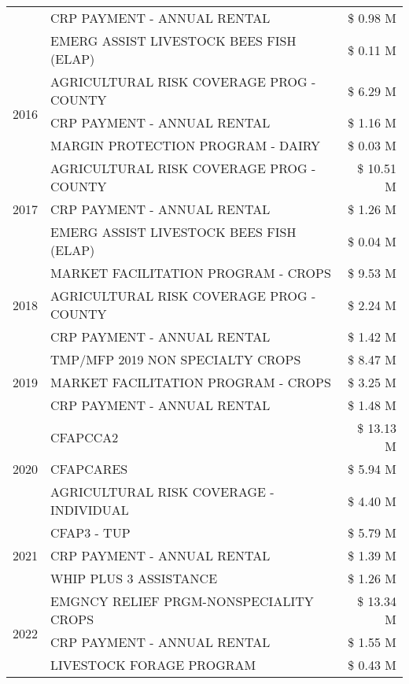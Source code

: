 \begin{tabular}{llr}
 & CRP PAYMENT - ANNUAL RENTAL & \$ 0.98 M \\
 & EMERG ASSIST LIVESTOCK BEES FISH (ELAP) & \$ 0.11 M \\
\cline{1-3}
\multirow[t]{3}{*}{2016} & AGRICULTURAL RISK COVERAGE PROG - COUNTY & \$ 6.29 M \\
 & CRP PAYMENT - ANNUAL RENTAL & \$ 1.16 M \\
 & MARGIN PROTECTION PROGRAM - DAIRY & \$ 0.03 M \\
\cline{1-3}
\multirow[t]{3}{*}{2017} & AGRICULTURAL RISK COVERAGE PROG - COUNTY & \$ 10.51 M \\
 & CRP PAYMENT - ANNUAL RENTAL & \$ 1.26 M \\
 & EMERG ASSIST LIVESTOCK BEES FISH (ELAP) & \$ 0.04 M \\
\cline{1-3}
\multirow[t]{3}{*}{2018} & MARKET FACILITATION PROGRAM - CROPS & \$ 9.53 M \\
 & AGRICULTURAL RISK COVERAGE PROG - COUNTY & \$ 2.24 M \\
 & CRP PAYMENT - ANNUAL RENTAL & \$ 1.42 M \\
\cline{1-3}
\multirow[t]{3}{*}{2019} & TMP/MFP 2019 NON SPECIALTY CROPS & \$ 8.47 M \\
 & MARKET FACILITATION PROGRAM - CROPS & \$ 3.25 M \\
 & CRP PAYMENT - ANNUAL RENTAL & \$ 1.48 M \\
\cline{1-3}
\multirow[t]{3}{*}{2020} & CFAPCCA2 & \$ 13.13 M \\
 & CFAPCARES & \$ 5.94 M \\
 & AGRICULTURAL RISK COVERAGE - INDIVIDUAL & \$ 4.40 M \\
\cline{1-3}
\multirow[t]{3}{*}{2021} & CFAP3 - TUP & \$ 5.79 M \\
 & CRP PAYMENT - ANNUAL RENTAL & \$ 1.39 M \\
 & WHIP PLUS 3 ASSISTANCE & \$ 1.26 M \\
\cline{1-3}
\multirow[t]{3}{*}{2022} & EMGNCY RELIEF PRGM-NONSPECIALITY CROPS & \$ 13.34 M \\
 & CRP PAYMENT - ANNUAL RENTAL & \$ 1.55 M \\
 & LIVESTOCK FORAGE PROGRAM & \$ 0.43 M \\
\cline{1-3}
\bottomrule
\end{tabular}
